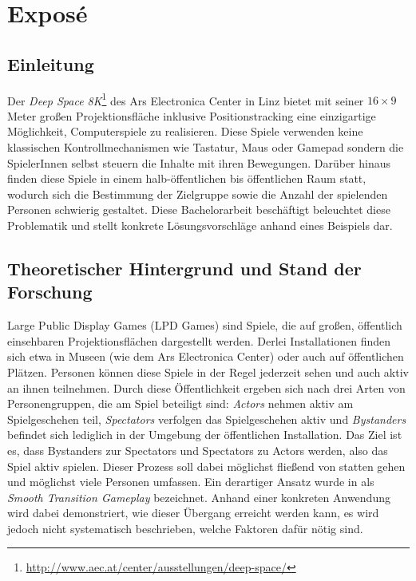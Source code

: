 \chapter{Exposé}

\section{Einleitung}

Der \emph{Deep Space 8K}\footnote{\url{http://www.aec.at/center/ausstellungen/deep-space/}} des Ars Electronica Center in Linz bietet mit seiner $16 \times 9$ Meter großen Projektionsfläche inklusive Positionstracking eine einzigartige Möglichkeit, Computerspiele zu realisieren. Diese Spiele verwenden keine klassischen Kontrollmechanismen wie Tastatur, Maus oder Gamepad sondern die SpielerInnen selbst steuern die Inhalte mit ihren Bewegungen. Darüber hinaus finden diese Spiele in einem halb-öffentlichen bis öffentlichen Raum statt, wodurch sich die Bestimmung der Zielgruppe sowie die Anzahl der spielenden Personen schwierig gestaltet. Diese Bachelorarbeit beschäftigt beleuchtet diese Problematik und stellt konkrete Lösungsvorschläge anhand eines Beispiels dar.

\section{Theoretischer Hintergrund und Stand der Forschung}
\label{sec:hintergrund}

Large Public Display Games (LPD Games) sind Spiele, die auf großen, öffentlich einsehbaren Projektionsflächen dargestellt werden. Derlei Installationen finden sich etwa in Museen (wie dem Ars Electronica Center) oder auch auf öffentlichen Plätzen. Personen können diese Spiele in der Regel jederzeit sehen und auch aktiv an ihnen teilnehmen. Durch diese Öffentlichkeit ergeben sich nach \cite{Finke2008} drei Arten von Personengruppen, die am Spiel beteiligt sind: \emph{Actors} nehmen aktiv am Spielgeschehen teil, \emph{Spectators} verfolgen das Spielgeschehen aktiv und \emph{Bystanders} befindet sich lediglich in der Umgebung der öffentlichen Installation. Das Ziel ist es, dass Bystanders zur Spectators und Spectators zu Actors werden, also das Spiel aktiv spielen. Dieser Prozess soll dabei möglichst fließend von statten gehen und möglichst viele Personen umfassen. Ein derartiger Ansatz wurde in \cite{Hochleitner2013} als \emph{Smooth Transition Gameplay} bezeichnet. Anhand einer konkreten Anwendung wird dabei demonstriert, wie dieser Übergang erreicht werden kann, es wird jedoch nicht systematisch beschrieben, welche Faktoren dafür nötig sind.


